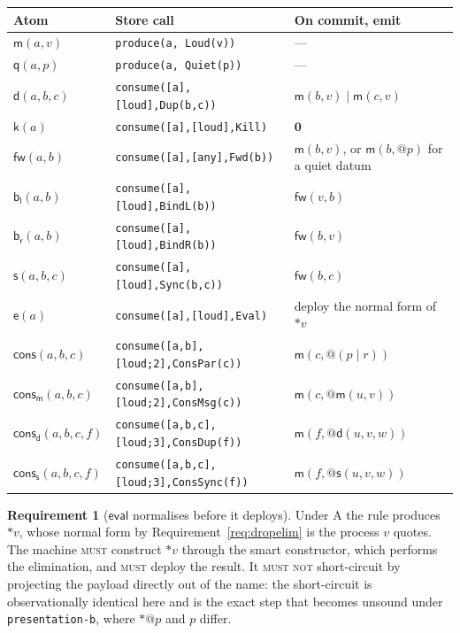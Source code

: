 \documentclass[11pt,a4paper]{article}
\makeatletter
\newcommand{\code}[1]{\texttt{#1}}
\newcommand{\MUST}{\textsc{must}}
\newcommand{\MUSTNOT}{\textsc{must not}}
\newcommand{\quo}[1]{@#1}
\newcommand{\drp}[1]{{*}#1}
\newcommand{\nil}{\mathbf{0}}
\newcommand{\mm}{\mathsf{m}}
\newcommand{\dd}{\mathsf{d}}
\newcommand{\kk}{\mathsf{k}}
\newcommand{\fw}{\mathsf{fw}}
\newcommand{\bl}{\mathsf{b}_{\mathsf{l}}}
\newcommand{\br}{\mathsf{b}_{\mathsf{r}}}
\newcommand{\sy}{\mathsf{s}}
\newcommand{\ev}{\mathsf{e}}
\newcommand{\qq}{\mathsf{q}}
\newcommand{\cons}{\mathsf{cons}}
\theoremstyle{definition}
\newtheorem{requirement}[definition]{Requirement}
\theoremstyle{plain}
\makeatother
\begin{document}
\begin{center}
\begin{tabularx}{\linewidth}{@{}ll>{\raggedright\arraybackslash}X@{}}
\toprule
Atom & Store call & On commit, emit\\
\midrule
$\mm(a,v)$ & \code{produce(a, Loud(v))} & ---\\
$\qq(a,p)$ & \code{produce(a, Quiet(p))} & ---\\
$\dd(a,b,c)$ & \code{consume([a],[loud],Dup(b,c))} & $\mm(b,v) \mid \mm(c,v)$\\
$\kk(a)$ & \code{consume([a],[loud],Kill)} & $\nil$\\
$\fw(a,b)$ & \code{consume([a],[any],Fwd(b))} & $\mm(b,v)$, or
  $\mm(b,\quo{p})$ for a quiet datum\\
$\bl(a,b)$ & \code{consume([a],[loud],BindL(b))} & $\fw(v,b)$\\
$\br(a,b)$ & \code{consume([a],[loud],BindR(b))} & $\fw(b,v)$\\
$\sy(a,b,c)$ & \code{consume([a],[loud],Sync(b,c))} & $\fw(b,c)$\\
$\ev(a)$ & \code{consume([a],[loud],Eval)} & deploy the normal form of
  $\drp{v}$\\
$\cons(a,b,c)$ & \code{consume([a,b],[loud;2],ConsPar(c))} &
  $\mm(c,\quo{(p \mid r)})$\\
$\cons_{\mm}(a,b,c)$ & \code{consume([a,b],[loud;2],ConsMsg(c))} &
  $\mm(c,\quo{\mm(u,v)})$\\
$\cons_{\dd}(a,b,c,f)$ & \code{consume([a,b,c],[loud;3],ConsDup(f))} &
  $\mm(f,\quo{\dd(u,v,w)})$\\
$\cons_{\sy}(a,b,c,f)$ & \code{consume([a,b,c],[loud;3],ConsSync(f))} &
  $\mm(f,\quo{\sy(u,v,w)})$\\
\bottomrule
\end{tabularx}
\end{center}

\begin{requirement}[$\mathsf{eval}$ normalises before it deploys]
\label{req:evalnorm}
Under A the rule produces $\drp{v}$, whose normal form by
Requirement~\ref{req:dropelim} is the process $v$ quotes. The machine \MUST{}
construct $\drp{v}$ through the smart constructor, which performs the
elimination, and \MUST{} deploy the result. It \MUSTNOT{} short-circuit by
projecting the payload directly out of the name: the short-circuit is
observationally identical here and is the exact step that becomes unsound
under \code{presentation-b}, where $\drp{\quo{p}}$ and $p$ differ.
\end{requirement}
\end{document}
